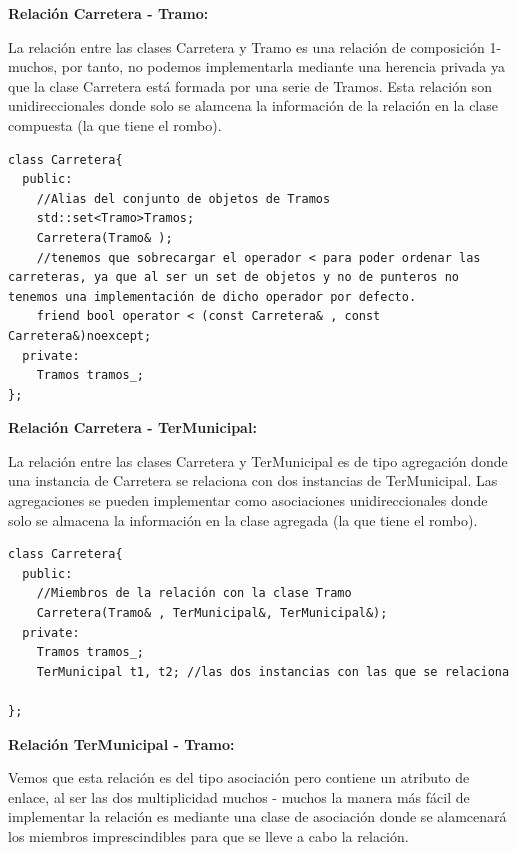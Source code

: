 \textbf{Relación Carretera - Tramo:}

La relación entre las clases Carretera y Tramo es una relación de composición 1-muchos, por tanto, no podemos implementarla mediante una herencia privada ya que la clase Carretera está formada por una serie de Tramos.
Esta relación son unidireccionales donde solo se alamcena la información de la relación en la clase compuesta (la que tiene el rombo).

\begin{verbatim}
class Carretera{
  public:
    //Alias del conjunto de objetos de Tramos
    std::set<Tramo>Tramos;
    Carretera(Tramo& );
    //tenemos que sobrecargar el operador < para poder ordenar las carreteras, ya que al ser un set de objetos y no de punteros no tenemos una implementación de dicho operador por defecto.
    friend bool operator < (const Carretera& , const Carretera&)noexcept;
  private:
    Tramos tramos_;
};
\end{verbatim}

\textbf{Relación Carretera - TerMunicipal:}

La relación entre las clases Carretera y TerMunicipal es de tipo agregación donde una instancia de Carretera se relaciona con dos instancias de TerMunicipal.
Las agregaciones se pueden implementar como asociaciones unidireccionales donde solo se almacena la información en la clase agregada (la que tiene el rombo).

\begin{verbatim}
class Carretera{
  public:
    //Miembros de la relación con la clase Tramo
    Carretera(Tramo& , TerMunicipal&, TerMunicipal&);
  private:
    Tramos tramos_;
    TerMunicipal t1, t2; //las dos instancias con las que se relaciona

};
\end{verbatim}

\textbf{Relación TerMunicipal - Tramo:}

Vemos que esta relación es del tipo asociación pero contiene un atributo de enlace, al ser las dos multiplicidad muchos - muchos la manera más fácil de implementar la relación es mediante una clase de asociación donde se alamcenará los miembros imprescindibles para que se lleve a cabo la relación.

